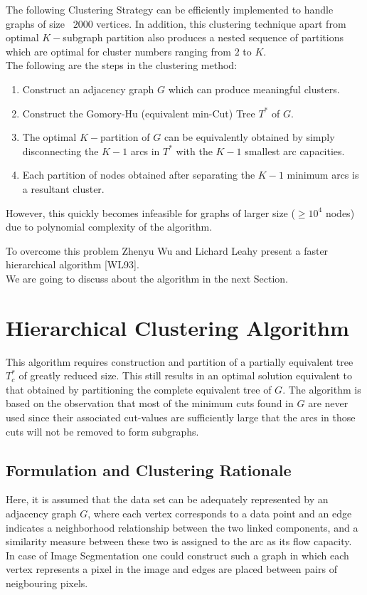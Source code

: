         The following Clustering Strategy can be efficiently implemented to handle graphs of size ~$2000$ vertices. In addition, this clustering technique apart from optimal $K-$subgraph partition also produces a nested sequence of partitions which are optimal for cluster numbers ranging from $2$ to $K$. \\
        The following are the steps in the clustering method:
        \begin{enumerate}
            \item {
                Construct an adjacency graph $G$ which can produce meaningful clusters.
            }
            \item {
                Construct the Gomory-Hu (equivalent min-Cut) Tree $T^*$ of $G$. 
            }
            \item {
                The optimal $K-$partition of $G$ can be equivalently obtained by simply disconnecting the $K-1$ arcs in $T^*$ with the $K-1$ smallest arc capacities.
            }
            \item {
                Each partition of nodes obtained after separating the $K-1$ minimum arcs is a resultant cluster.
            }
        \end{enumerate}
        
        \noindent However, this quickly becomes infeasible for graphs of larger size ($\geq 10^4 $ nodes) due to polynomial complexity of the algorithm.

        To overcome this problem Zhenyu Wu and Lichard Leahy present a faster hierarchical algorithm [WL93]. \\
        We are going to discuss about the algorithm in the next Section.

    \section{Hierarchical Clustering Algorithm}
        This algorithm requires construction and partition of a partially equivalent tree $T^*_c$ of greatly reduced size. This still results in an optimal solution equivalent to that obtained by partitioning the complete equivalent tree of $G$. The algorithm is based on the observation that most of the minimum cuts found in $G$ are never used since their associated cut-values are sufficiently large that the arcs in those cuts will not be removed to form subgraphs.

        \subsection{Formulation and Clustering Rationale}
            Here, it is assumed that the data set can be adequately represented by an adjacency graph $G$, where each vertex corresponds to a data point and an edge indicates a neighborhood relationship between the two linked components, and a similarity measure between these two is assigned to the arc as its flow capacity. \\
            In case of Image Segmentation one could construct such a graph in which each vertex represents a pixel in the image and edges are placed between pairs of neigbouring pixels.

